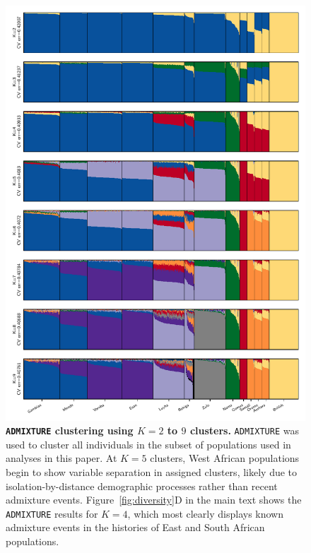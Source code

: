 \documentclass[]{article}
\begin{document}
\begin{figure}[ht]
    \centering
    \includegraphics[width=5.75in]{figures/supp-admixture-panels}
    \caption{
        \textbf{\texttt{ADMIXTURE} clustering using $K=2$ to $9$ clusters.}
        \texttt{ADMIXTURE} \citep{Alexander2009-sw} was used to cluster all
        individuals in the subset of populations used in analyses in this
        paper. At $K=5$ clusters, West African populations begin to show
        variable separation in assigned clusters, likely due to
        isolation-by-distance demographic processes rather than recent
        admixture events. Figure~\ref{fig:diversity}D in the main text shows
        the \texttt{ADMIXTURE} results for $K=4$, which most clearly displays
        known admixture events in the histories of East and South African
        populations.
    }
    \label{fig:supp-admixture}
\end{figure}
\end{document}
